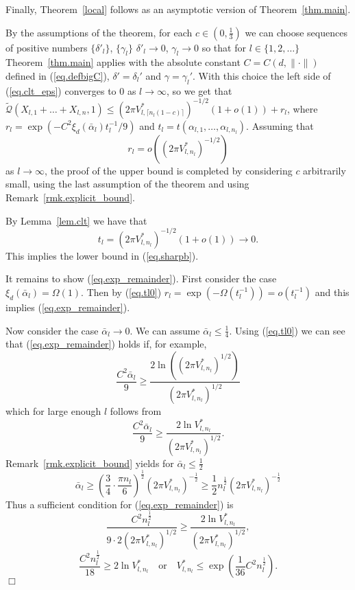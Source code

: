 \documentclass{article}
\newenvironment{proofof}[1]{\noindent {\bf Proof of #1}}{\hspace*{\fill}$\Box$}
\newcommand{\concdiam}{\tilde{\mathcal{Q}}}
\begin{document}
Finally, Theorem~\ref{local} follows as an asymptotic version of Theorem~\ref{thm.main}.

\medskip

\begin{proofof}{Theorem~\ref{local}}
    By the assumptions of the theorem, for each $c \in (0, \frac 1 3)$
    we can choose sequences of positive numbers $\{\delta'_l\}$, $\{\gamma_l\}$
    $\delta'_l \to 0$, $\gamma_l \to 0$ so that for $l \in \{1,2,\dots\}$
    Theorem~\ref{thm.main} applies with the absolute constant $C=C(d, \|\cdot\|)$ defined in (\ref{eq.defbigC}), 
    $\delta' = \delta_l'$ and $\gamma = \gamma_l'$.
    With this choice the left side of (\ref{eq.clt_eps}) converges to 0 as $l \to \infty$, 
    so we get that $\concdiam(X_{l,1} + \dots + X_{l,n}, 1) \le (2 \pi V^*_{l, \lceil n_l(1-c) \rceil})^{-1/2} (1 + o(1)) + r_l$,
    where $r_l = \exp(-C^2 \xi_d(\bar{\alpha}_l) t_l^{-1}/9)$ and $t_l=t(\alpha_{l,1}, \dots, \alpha_{l,n_l})$. Assuming that 
    \begin{equation}\label{eq.exp_remainder}
        r_l = o((2 \pi V^*_{l, {n_l}})^{-1/2})
    \end{equation}
    as $l\to\infty$, the proof of the upper bound is 
    completed by considering $c$ arbitrarily small, using the last assumption of the theorem and using Remark~\ref{rmk.explicit_bound}.

    By Lemma~\ref{lem.clt} we have that 
    \begin{equation}\label{eq.tl0}
        t_l =  (2 \pi V^*_{l, n_l})^{-1/2} (1 + o(1)) \to 0.
    \end{equation}
    This implies the lower bound in (\ref{eq.sharpb}).

    It remains to show (\ref{eq.exp_remainder}).
    First consider the case $\xi_d(\bar{\alpha}_l)=\Omega(1)$. 
Then by (\ref{eq.tl0}) $r_l = \exp(-\Omega(t_l^{-1})) = o(t_l^{-1})$
    and this implies (\ref{eq.exp_remainder}).

    Now consider the case $\bar{\alpha}_l \to 0$. We can assume $\bar{\alpha}_l \le \frac 1 4$.
    Using (\ref{eq.tl0}) we can see that (\ref{eq.exp_remainder})
    holds if, for example,
    \[
        \frac {C^2 \bar{\alpha}_l} 9 \ge \frac {2 \ln \left( (2 \pi V^*_{l, n_l})^{1/2} \right)} {(2 \pi V^*_{l, n_l})^{1/2}}
    \]
    which for large enough $l$ follows from
    \[
        \frac {C^2 \bar{\alpha}_l} 9 \ge \frac {2 \ln  V^*_{l, n_l}} {(2 \pi V^*_{l, n_l})^{1/2}}.
    \]
    Remark~\ref{rmk.explicit_bound} yields for $\bar{\alpha}_l \le \frac 1 2$
    \[
        \bar{\alpha}_l \ge \left(\frac 3 4 \cdot \frac {\pi n_l} 6 \right)^{\frac 1 2} ({2 \pi V^*_{l, n_l}})^{- \frac 1 2} \ge \frac 1 2 n_l^{\frac 1 2} ({2 \pi V^*_{l, n_l}})^{- \frac 1 2} 
    \]
    Thus a sufficient condition for (\ref{eq.exp_remainder}) is
    \[
        \frac {C^2 n_l^{\frac 1 2}} {9 \cdot 2 (2 \pi V^*_{l, n_l})^{1/2} }  \ge \frac {2 \ln V^*_{l, n_l}} {(2 \pi V^*_{l, n_l})^{1/2}},
    \]
    \[
        \frac {C^2 n_l^{\frac 1 2}} {18}  \ge 2 \ln  V^*_{l, n_l}\quad \mbox{or}\quad V^*_{l,n_l} \le \exp(\frac 1 {36} C^2 n_l^{\frac 1 2}).
    \]
\end{proofof}
\end{document}
